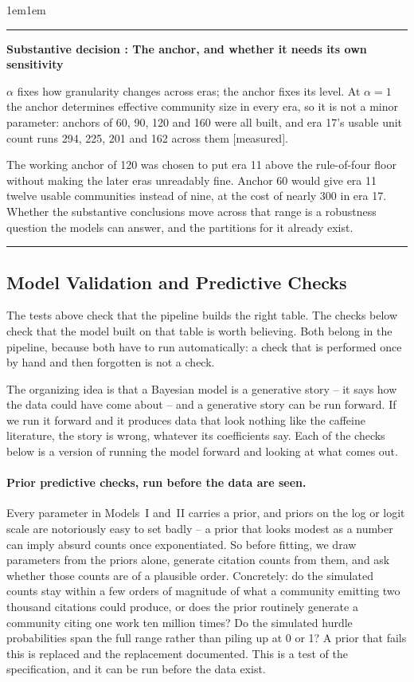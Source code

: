 \documentclass[11pt]{article}
\newcommand{\meas}{{\footnotesize\textsf{[measured]}}}
\newcounter{decisioncnt}
\newenvironment{decision}[1]{%
  \refstepcounter{decisioncnt}%
  \par\vspace{0.8em}\noindent
  \begin{adjustwidth}{1em}{1em}%
  \rule{\linewidth}{1.1pt}\par\vspace{0.3em}
  \noindent\textbf{Substantive decision \thedecisioncnt: #1}\par\vspace{0.2em}\small
}{%
  \par\vspace{0.3em}\noindent\rule{\linewidth}{1.1pt}%
  \end{adjustwidth}\vspace{0.8em}
}
\begin{document}
\begin{decision}{The anchor, and whether it needs its own sensitivity}
	$\alpha$ fixes how granularity changes across eras; the anchor fixes its level. At
	$\alpha = 1$ the anchor determines effective community size in every era, so it is not a
	minor parameter: anchors of 60, 90, 120 and 160 were all built, and era 17's usable unit
	count runs 294, 225, 201 and 162 across them \meas{}.

	The working anchor of 120 was chosen to put era 11 above the rule-of-four floor without
	making the later eras unreadably fine. Anchor 60 would give era 11 twelve usable communities
	instead of nine, at the cost of nearly 300 in era 17. Whether the substantive conclusions
	move across that range is a robustness question the models can answer, and the partitions
	for it already exist.
\end{decision}

\subsection{Model Validation and Predictive Checks}
\label{sec:validation}

The tests above check that the pipeline builds the right table. The checks below check that
the model built on that table is worth believing. Both belong in the pipeline, because both
have to run automatically: a check that is performed once by hand and then forgotten is not a
check.

The organizing idea is that a Bayesian model is a generative story -- it says how the data
could have come about -- and a generative story can be run forward. If we run it forward
and it produces data that look nothing like the caffeine literature, the story is wrong,
whatever its coefficients say. Each of the checks below is a version of running the model
forward and looking at what comes out.

\paragraph{Prior predictive checks, run before the data are seen.} Every parameter in
Models~I and~II carries a prior, and priors on the log or logit scale are notoriously easy to
set badly -- a prior that looks modest as a number can imply absurd counts once exponentiated.
So before fitting, we draw parameters from the priors alone, generate citation counts from
them, and ask whether those counts are of a plausible order. Concretely: do the simulated
counts stay within a few orders of magnitude of what a community emitting two thousand
citations could produce, or does the prior routinely generate a community citing one work ten
million times? Do the simulated hurdle probabilities span the full range rather than piling up
at 0 or 1? A prior that fails this is replaced and the replacement documented. This is a test
of the specification, and it can be run before the data exist.
\end{document}
